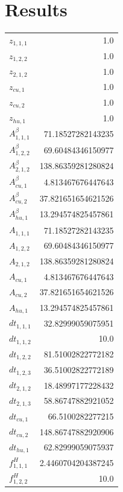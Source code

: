 \documentclass{article}%
\makeatletter
\let\mcnewpage=\newpage%
\newcommand{\TrickSupertabularIntoMulticols}{%
\renewcommand\newpage{%
\if@firstcolumn%
\hrule width\linewidth height0pt%
\columnbreak%
\else%
\mcnewpage%
\fi%
}%
}%
\makeatother
\begin{document}
\section{Results}%
\thispagestyle{plain}%
\begin{multicols*}{3}%
\TrickSupertabularIntoMulticols%
%
\begin{supertabular}{lr}%
	$z_{1,1,1}$ & 1.0 \\%
	$z_{1,2,2}$ & 1.0 \\%
	$z_{2,1,2}$ & 1.0 \\%
	$z_{cu,1}$ & 1.0 \\%
	$z_{cu,2}$ & 1.0 \\%
	$z_{hu,1}$ & 1.0 \\%
	$A_{1,1,1}^{\beta}$ & 71.18527282143235 \\%
	$A_{1,2,2}^{\beta}$ & 69.60484346150977 \\%
	$A_{2,1,2}^{\beta}$ & 138.86359281280824 \\%
	$A_{cu,1}^{\beta}$ & 4.813467676447643 \\%
	$A_{cu,2}^{\beta}$ & 37.821651654621526 \\%
	$A_{hu,1}^{\beta}$ & 13.294574825457861 \\%
	$A_{1,1,1}$ & 71.18527282143235 \\%
	$A_{1,2,2}$ & 69.60484346150977 \\%
	$A_{2,1,2}$ & 138.86359281280824 \\%
	$A_{cu,1}$ & 4.813467676447643 \\%
	$A_{cu,2}$ & 37.821651654621526 \\%
	$A_{hu,1}$ & 13.294574825457861 \\%
	$dt_{1,1,1}$ & 32.82999059075951 \\%
	$dt_{1,1,2}$ & 10.0 \\%
	$dt_{1,2,2}$ & 81.51002822772182 \\%
	$dt_{1,2,3}$ & 36.51002822772189 \\%
	$dt_{2,1,2}$ & 18.48997177228432 \\%
	$dt_{2,1,3}$ & 58.86747882921052 \\%
	$dt_{cu,1}$ & 66.5100282277215 \\%
	$dt_{cu,2}$ & 148.86747882920906 \\%
	$dt_{hu,1}$ & 62.82999059075937 \\%
	$f_{1,1,1}^{H}$ & 2.4460704204387245 \\%
	$f_{1,2,2}^{H}$ & 10.0 \\%

\end{supertabular}
\end{multicols*}
\end{document}
